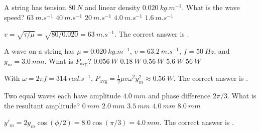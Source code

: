 \documentclass[full,print,11pt,a4paper]{physicsquiz}
\begin{document}
\begin{quizbank}
  \begin{quizquestion}[
    id=ow-string-016,
    topic=waves-on-strings,
    difficulty=applied,
    marks=1,
    correct=A,
    tags={string-speed,tension},
    outcome={Compute wave speed on a string}
  ]
    A string has tension \(\SI{80}{N}\) and linear density
    \(\SI{0.020}{kg.m^{-1}}\). What is the wave speed?
    \choices
      {\(\SI{63}{m.s^{-1}}\)}
      {\(\SI{40}{m.s^{-1}}\)}
      {\(\SI{20}{m.s^{-1}}\)}
      {\(\SI{4.0}{m.s^{-1}}\)}
      {\(\SI{1.6}{m.s^{-1}}\)}
  \end{quizquestion}
  \begin{quizsolution}
    \(v=\sqrt{\tau/\mu}=\sqrt{80/0.020}=\SI{63}{m.s^{-1}}\). The correct answer
    is \quizcorrectletter.
  \end{quizsolution}

  \begin{quizquestion}[
    id=ow-power-017,
    topic=waves-on-strings,
    difficulty=applied,
    marks=1,
    correct=C,
    tags={wave-power},
    outcome={Compute average power for a string wave}
  ]
    A wave on a string has \(\mu=\SI{0.020}{kg.m^{-1}}\),
    \(v=\SI{63.2}{m.s^{-1}}\), \(f=\SI{50}{Hz}\), and
    \(y_m=\SI{3.0}{mm}\). What is \(P_{\text{avg}}\)?
    \choices
      {\(\SI{0.056}{W}\)}
      {\(\SI{0.18}{W}\)}
      {\(\SI{0.56}{W}\)}
      {\(\SI{5.6}{W}\)}
      {\(\SI{56}{W}\)}
  \end{quizquestion}
  \begin{quizsolution}
    With \(\omega=2\pi f=\SI{314}{rad.s^{-1}}\),
    \(P_{\text{avg}}=\frac{1}{2}\mu v\omega^2y_m^2\approx\SI{0.56}{W}\). The
    correct answer is \quizcorrectletter.
  \end{quizsolution}

  \begin{quizquestion}[
    id=ow-interference-018,
    topic=interference,
    difficulty=applied,
    marks=1,
    correct=D,
    tags={phase,resultant-amplitude},
    outcome={Compute resultant amplitude for equal waves}
  ]
    Two equal waves each have amplitude \(\SI{4.0}{mm}\) and phase difference
    \(2\pi/3\). What is the resultant amplitude?
    \choices
      {\(\SI{0}{mm}\)}
      {\(\SI{2.0}{mm}\)}
      {\(\SI{3.5}{mm}\)}
      {\(\SI{4.0}{mm}\)}
      {\(\SI{8.0}{mm}\)}
  \end{quizquestion}
  \begin{quizsolution}
    \(y'_m=2y_m\cos(\phi/2)=8.0\cos(\pi/3)=\SI{4.0}{mm}\). The correct answer
    is \quizcorrectletter.
  \end{quizsolution}


\end{quizbank}
\end{document}
